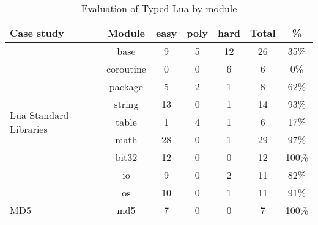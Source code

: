 \begin{table}[!ht]
\begin{center}
\begin{tabular}{|l|c|c|c|c|c|c|}
\hline
\textbf{Case study} & \textbf{Module} & \textbf{easy} & \textbf{poly} & \textbf{hard} & \textbf{Total} & \textbf{\%} \\
\hline
\multirow{9}{*}{Lua Standard Libraries}
& base & 9 & 5 & 12 & 26 & 35\% \\
\cline{2-7}
& coroutine & 0 & 0 & 6 & 6 & 0\% \\
\cline{2-7}
& package & 5 & 2 & 1 & 8 & 62\% \\
\cline{2-7}
& string & 13 & 0 & 1 & 14 & 93\% \\
\cline{2-7}
& table & 1 & 4 & 1 & 6 & 17\% \\
\cline{2-7}
& math & 28 & 0 & 1 & 29 & 97\% \\
\cline{2-7}
& bit32 & 12 & 0 & 0 & 12 & 100\% \\
\cline{2-7}
& io & 9 & 0 & 2 & 11 & 82\% \\
\cline{2-7}
& os & 10 & 0 & 1 & 11 & 91\% \\
\hline
\multirow{1}{*}{MD5}
& md5 & 7 & 0 & 0 & 7 & 100\% \\
\hline
\end{tabular}
\end{center}
\caption{Evaluation of Typed Lua by module}
\label{tab:evalbymod}
\end{table}

